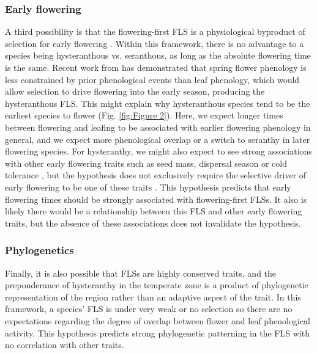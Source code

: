 \documentclass[12pt]{article}
\begin{document}
\subsubsection*{Early flowering}
\indent\indent A third possibility is that the flowering-first FLS is a physiological byproduct of selection for early flowering \citep{Primack1987}. Within this framework, there is no advantage to a species being hysteranthous vs. seranthous, as long as the absolute flowering time is the same. Recent work from \citet{Savage2019} has demonstrated that spring flower phenology is less constrained by prior phenological events than leaf phenology, which would allow selection to drive flowering into the early season, producing the hysteranthous FLS. This might explain why hysteranthous species tend to be the earliest species to flower (Fig. \ref{fig:Figure 2}). Here, we expect longer times between flowering and leafing to be associated with earlier flowering phenology in general, and we expect more phenological overlap or a switch to seranthy in later flowering species. For hysteranthy, we might also expect to see strong associations with other early flowering traits such as seed mass, dispersal season or cold tolerance \citep{Gougherty2018}, but the hypothesis does not exclusively require the selective driver of early flowering to be one of these traits \citep{Savage2019}. This hypothesis predicts that early flowering times should be strongly associated with flowering-first FLSs. It also is likely there would be a relationship between this FLS and other early flowering traits, but the absence of these associations does not invalidate the hypothesis.

\subsubsection*{Phylogenetics} 
\indent\indent Finally, it is also possible that FLSs are highly conserved traits, and the preponderance of hysteranthy in the temperate zone is a product of phylogenetic representation of the region rather than an adaptive aspect of the trait. In this framework, a species' FLS is under very weak or no selection so there are no expectations regarding the degree of overlap between flower and leaf phenological activity. This hypothesis predicts strong phylogenetic patterning in the FLS with no correlation with other traits.\\
\end{document}
